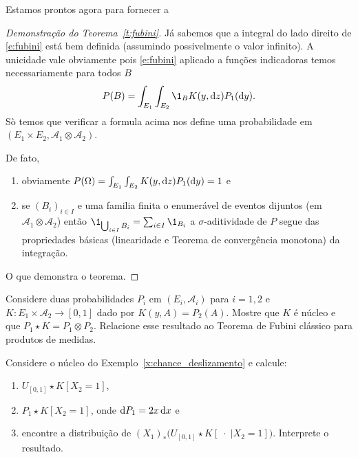 Estamos prontos agora para fornecer a
\begin{proof}[Demonstração do Teorema~\ref{t:fubini}]
  Já sabemos que a integral do lado direito de \eqref{e:fubini} está bem definida (assumindo possivelmente o valor infinito).
  A unicidade vale obviamente pois \eqref{e:fubini} aplicado a funções indicadoras temos necessariamente para todos $B$
\begin{equation}
    P(B) = \int_{E_1} \int_{E_2} \1_{B} K(y, \d z) P_1 (\d y).
  \end{equation}
  Sò temos que verificar a formula acima nos define uma probabilidade em $(E_1 \times E_2, \mathcal{A}_1 \otimes \mathcal{A}_2)$.

  De fato,
  \begin{enumerate}[\quad a)]
  \item obviamente $P(\Omega) = \int_{E_1} \int_{E_2}  K(y, \mathop{}\!\mathrm{d} z) P_1(\mathop{}\!\mathrm{d} y) = 1$ e
  \item se $(B_i)_{i\in I}$ e uma familia finita o enumerável de eventos dijuntos (em $\mathcal{A}_1 \otimes \mathcal{A}_2$) então
  $\1_{\bigcup_{i\in I} B_i}=\sum_{i\in I} \1_{B_i}$ a $\sigma$-aditividade de $P$ segue das propriedades básicas
  (linearidade e Teorema de convergência monotona) da integração.
  \end{enumerate}
  O que demonstra o teorema.
\end{proof}

\begin{exercise}
  \label{x:nucleo_constante}
  Considere duas probabilidades $P_i$ em $(E_i, \mathcal{A}_i)$ para $i = 1,2$ e $K:E_1 \times \mathcal{A}_2 \to [0,1]$ dado por $K(y,A) = P_2(A)$.
  Mostre que $K$ é núcleo e que $P_1 \star K = P_1 \otimes P_2$.
  Relacione esse resultado ao Teorema de Fubini clássico para produtos de medidas.
\end{exercise}

\begin{exercise}
  Considere o núcleo do Exemplo~\ref{x:chance_deslizamento} e calcule:
  \begin{enumerate}[\quad a)]
  \item $U_{[0,1]} \star K [X_2 = 1]$,
  \item $P_1 \star K [X_2 = 1]$, onde $\mathop{}\!\mathrm{d} P_1 = 2x \mathop{}\!\mathrm{d} x$ e
  \item encontre a distribuição de $(X_1)_* \big( U_{[0,1]} \star K [\; \cdot \; | X_2 = 1] \big)$. Interprete o resultado.
  \end{enumerate}
\end{exercise}

